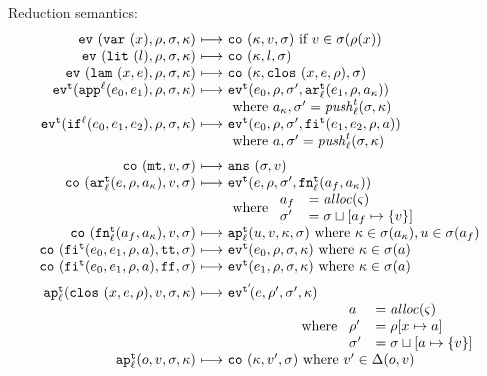 \documentclass{llncs}
\begin{document}
Reduction semantics:
\begin{gather*}
\begin{array}{@{}r@{\ }c@{\ }l@{}}
\ev{\svar\mvar,\menv,\msto,\mkont} &\machstep&
\co{\mkont,\mval,\msto} \text{ if } \mval \in \msto(\menv(\mvar))
\\
\ev{\slit\mlit,\menv,\msto,\mkont} &\machstep&
\co{\mkont,\mlit,\msto}
\\
\ev{\slam\mvar\mexp,\menv,\msto,\mkont} &\machstep&
\co{\mkont,\clos{\mvar,\mexp,\menv},\msto}
\\
\ev[^\mcntr]{\sapp[^\mlab]{\mexpi0}{\mexpi1},\menv,\msto,\mkont} &\machstep&
\ev[^\mcntr]{\mexpi{0},\menv,\msto',\kar[_\mlab^\mcntr]{\mexpi{1},\menv,\maddr_\mkont}}
\\
&&
\text{ where }\maddr_\mkont,\msto' = \push^\mcntr_\mlab(\msto,\mkont)
\\
\ev[^\mcntr]{\sif[^\mlab]{\mexpi0}{\mexpi1}{\mexpi2},\menv,\msto,\mkont} &\machstep&
\ev[^\mcntr]{\mexpi0,\menv,\msto',\kif[^\mcntr]{\mexpi1,\mexpi2,\menv,\maddr}}
\\
&&
\text{ where }\maddr,\msto' = \push_\mlab^\mcntr(\msto,\mkont)
\\[2mm]
\co{\kmt,\mval,\msto} &\machstep&
\ans{\msto,\mval}
\\
\co{\kar[^\mcntr_\mlab]{\mexp,\menv,\maddr_\mkont},\mval,\msto} & \machstep&
\ev[^\mcntr]{\mexp,\menv,\msto',\kfn[^\mcntr_\mlab]{\maddr_f,\maddr_\mkont}}
\\
&&
\text{ where }
\begin{array}{ll}
 \maddr_f &= \alloc(\mstate) \\
 \msto' &= \msto\sqcup[\maddr_f \mapsto \{\mval\}]
\end{array}
\\
\co{\kfn[^\mcntr_\mlab]{\maddr_f,\maddr_\mkont},\mval,\msto} & \machstep&
\ap[^\mcntr_\mlab]{\mvalx{u},\mval,\mkont,\msto}
\text{ where } \mkont \in \msto(\maddr_\mkont), \mvalx{u} \in \msto(\maddr_f)
\\
\co{\kif[^\mcntr]{\mexpi0,\mexpi1,\menv,\maddr},\strue,\msto} & \machstep&
\ev[^\mcntr]{\mexpi0,\menv,\msto,\mkont}
\text{ where }\mkont\in\msto(\maddr)
\\
\co{\kif[^\mcntr]{\mexpi0,\mexpi1,\menv,\maddr},\sfalse,\msto} & \machstep&
\ev[^\mcntr]{\mexpi1,\menv,\msto,\mkont}
\text{ where }\mkont\in\msto(\maddr)
\\[2mm]
\ap[^\mcntr_\mlab]{\clos{\mvar,\mexp,\menv},\mval,\msto,\mkont} & \machstep&
\ev[^{\mcntr'}\!]{\mexp,\menv',\msto',\mkont}
\\
\multicolumn{3}{r@{}}{
\text{ where }
\begin{array}{ll}
 \maddr &= \alloc(\mstate) \\
 \menv' &= \menv[\mvar \mapsto \maddr] \\
 \msto' &= \msto\sqcup[\maddr \mapsto\{\mval\}]
\end{array}}
\\
\ap[^\mcntr_\mlab]{\mop,\mval,\msto,\mkont} & \machstep&
\co{\mkont,\mval',\msto}
\text{ where } \mval'\in\interpdelta(\mop,\mval)
\end{array}
\end{gather*}
\end{document}
